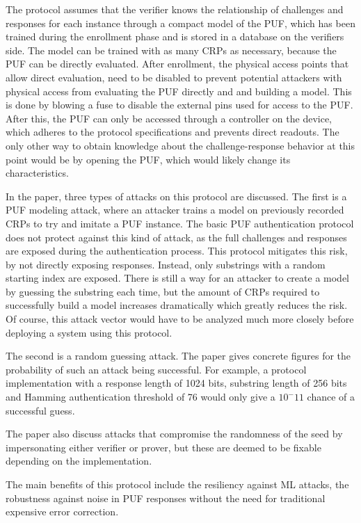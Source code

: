 The protocol assumes that the verifier knows the relationship of challenges and responses for each
instance through a compact model of the PUF, which has been trained during the enrollment phase
and is stored in a database on the verifiers side. The model can be trained with as many CRPs as necessary,
because the PUF can be directly evaluated. After enrollment, the physical access points
that allow direct evaluation, need to be disabled to prevent potential attackers with physical access
from evaluating the PUF directly and and building a model. This is done by blowing a fuse to disable the
external pins used for access to the PUF. After this, the PUF can only be accessed through a controller on the
device, which adheres to the protocol specifications and prevents direct readouts.
The only other way to obtain knowledge about the challenge-response behavior
at this point would be by opening the PUF, which would likely change its characteristics. \cite{Majzoobi2012}

In the paper, three types of attacks on this protocol are discussed.
The first is a PUF modeling attack, where an attacker trains a model on previously
recorded CRPs to try and imitate a PUF instance. The basic PUF authentication protocol
does not protect against this kind of attack, as the full challenges and responses are
exposed during the authentication process. This protocol mitigates this risk, by not directly
exposing responses. Instead, only substrings with a random starting index are exposed.
There is still a way for an attacker to create a model by guessing the substring each time,
but the amount of CRPs required to successfully build a model increases dramatically
which greatly reduces the risk. Of course, this attack vector would have to be analyzed
much more closely before deploying a system using this protocol. \cite{Majzoobi2012}

The second is a random guessing attack.
The paper gives concrete figures for the probability of such an attack being successful.
For example, a protocol implementation with a response length of 1024 bits, substring length of 256
bits and Hamming authentication threshold of 76 would only give a $10^-11$ chance of a successful guess. \cite{Majzoobi2012}

The paper also discuss attacks that compromise the randomness of the seed by impersonating
either verifier or prover, but these are deemed to be fixable depending on the implementation. \cite{Majzoobi2012}

The main benefits of this protocol include the resiliency against ML attacks, the robustness
against noise in PUF responses without the need for traditional expensive error correction. \cite{Majzoobi2012}


